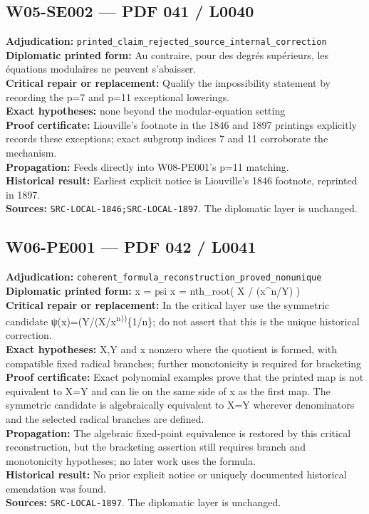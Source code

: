 \documentclass[
  10pt,
  a4paper,
]{scrreprt}
\begin{document}
\subsection{W05-SE002 --- PDF 041 /
L0040}\label{w05-se002-pdf-041-l0040}

\textbf{Adjudication:}
\texttt{printed\_claim\_rejected\_source\_internal\_correction}\\
\textbf{Diplomatic printed form:} Au contraire, pour des degrés
supérieurs, les équations modulaires ne peuvent s'abaisser.\\
\textbf{Critical repair or replacement:} Qualify the impossibility
statement by recording the p=7 and p=11 exceptional lowerings.\\
\textbf{Exact hypotheses:} none beyond the modular-equation setting\\
\textbf{Proof certificate:} Liouville's footnote in the 1846 and 1897
printings explicitly records these exceptions; exact subgroup indices 7
and 11 corroborate the mechanism.\\
\textbf{Propagation:} Feeds directly into W08-PE001's p=11 matching.\\
\textbf{Historical result:} Earliest explicit notice is Liouville's 1846
footnote, reprinted in 1897.\\
\textbf{Sources:} \texttt{SRC-LOCAL-1846;SRC-LOCAL-1897}. The diplomatic
layer is unchanged.

\subsection{W06-PE001 --- PDF 042 /
L0041}\label{w06-pe001-pdf-042-l0041}

\textbf{Adjudication:}
\texttt{coherent\_formula\_reconstruction\_proved\_nonunique}\\
\textbf{Diplomatic printed form:} x = psi x = nth\_root( X / (x\^{}n/Y)
)\\
\textbf{Critical repair or replacement:} In the critical layer use the
symmetric candidate ψ(x)=(Y/(X/x\textsuperscript{n))}\{1/n\}; do not
assert that this is the unique historical correction.\\
\textbf{Exact hypotheses:} X,Y and x nonzero where the quotient is
formed, with compatible fixed radical branches; further monotonicity is
required for bracketing\\
\textbf{Proof certificate:} Exact polynomial examples prove that the
printed map is not equivalent to X=Y and can lie on the same side of x
as the first map. The symmetric candidate is algebraically equivalent to
X=Y wherever denominators and the selected radical branches are
defined.\\
\textbf{Propagation:} The algebraic fixed-point equivalence is restored
by this critical reconstruction, but the bracketing assertion still
requires branch and monotonicity hypotheses; no later work uses the
formula.\\
\textbf{Historical result:} No prior explicit notice or uniquely
documented historical emendation was found.\\
\textbf{Sources:} \texttt{SRC-LOCAL-1897}. The diplomatic layer is
unchanged.
\end{document}
